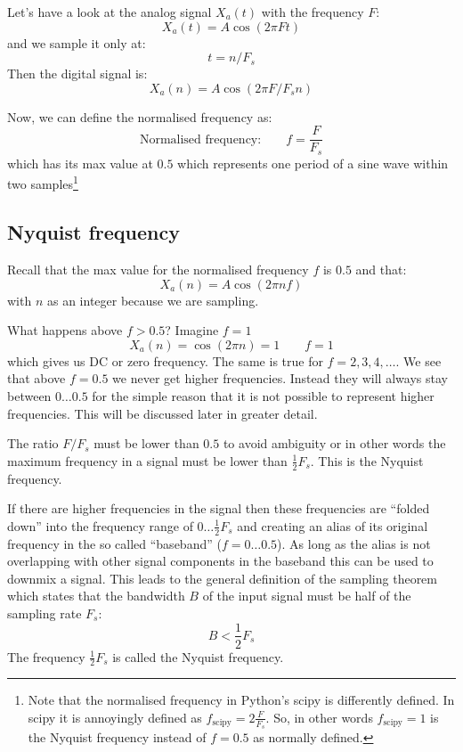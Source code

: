 \documentclass[12pt,a4paper]{article}
\begin{document}
Let's have a look at the analog signal $X_{a}(t)$ with the frequency $F$:
\begin{equation}
X_{a}(t) = A\cos (2\pi F t)
\end{equation}
and we sample it only at:
\begin{equation}
t = n/F_s
\end{equation}
Then the digital signal is:
\begin{equation}
X_{a}(n) = A \cos (2 \pi F/F_s n)
\end{equation}

Now, we can define the normalised frequency as:
\begin{equation}
\mbox{Normalised frequency:} \qquad f =  \frac {F}{F_s}
\end{equation}
which has its max value at $0.5$ which represents one period of
a sine wave within two samples\footnote{Note that the normalised
frequency in Python's scipy is differently defined. In scipy it is
annoyingly defined as $f_{\mbox{scipy}} =  2 \frac {F}{F_s}$. So, in other
words $f_{\mbox{scipy}}=1$ is the Nyquist frequency instead
of $f=0.5$ as normally defined.}


\subsection{Nyquist frequency}
Recall that the max value for the normalised frequency $f$ is $0.5$
and that:
\begin{equation}
X_{a}(n) = A \cos (2 \pi n f)
\end{equation}
with $n$ as an integer because
we are sampling.

What happens above $f>0.5$? Imagine $f = 1$
\begin{equation}
X_{a}(n) = \cos (2 \pi n) = 1 \qquad f=1
\end{equation}
which gives us DC or zero frequency. The same is true for
$f = 2, 3, 4, \ldots$. We see that above $f=0.5$ we never
get higher frequencies. Instead they will always stay between
$0\ldots 0.5$ for the simple reason that it is not possible
to represent higher frequencies. This will be discussed later
in greater detail.

The ratio $F/F_s$ must  be lower than $0.5$ to avoid ambiguity
or in other words the maximum frequency in a signal must be lower than 
$\frac{1}{2} F_s$. This is the Nyquist frequency.

If there are higher frequencies in the signal then these frequencies
are ``folded down'' into the frequency range of $0\ldots \frac{1}{2} F_s$
and creating an alias of its original frequency in the so called
``baseband'' ($f=0\ldots 0.5$). As long as the alias is not overlapping
with other signal components in the baseband this can be used to
downmix a signal. This leads to the general definition of the
sampling theorem which states that the bandwidth $B$ of the input signal
must be half of the sampling rate $F_s$:
\begin{equation}
B < \frac{1}{2}F_s
\label{samplingTheorem}
\end{equation}
The frequency $\frac{1}{2}F_s$ is called the Nyquist frequency.
\end{document}

